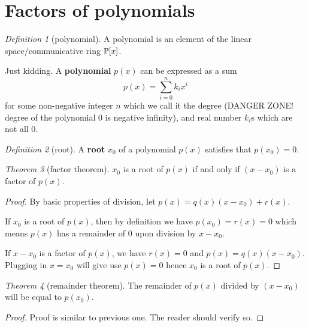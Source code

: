\documentclass[8pt]{article}
\theoremstyle{remark}
\newtheorem{theorem}{Theorem}[section]
\newtheorem{definition}[theorem]{Definition}
\begin{document}
    \section{Factors of polynomials}
        \begin{definition}[polynomial]
            A polynomial is an element of the linear space/communicative ring $\mathbb{P} [x]$.

            Just kidding. A \textbf{polynomial} $p(x)$ can be expressed as a sum
            $$
                p(x) = \sum_{i = 0}^{n} k_i x^i
            $$
            for some non-negative integer $n$ which we call it the degree (DANGER ZONE! degree of the polynomial 0 is negative infinity), and real number $k_i$s which are not all 0. 
        \end{definition}

        \begin{definition}[root]
            A \textbf{root} $x_0$ of a polynomial $p(x)$ satisfies that $p(x_0) = 0$.
        \end{definition}

        \begin{theorem}[factor theorem]
            $x_0$ is a root of $p(x)$ if and only if $(x - x_0)$ is a factor of $p(x)$.

            \begin{proof}
                By basic properties of division, let $p(x) = q(x) (x - x_0) + r(x)$.

                If $x_0$ is a root of $p(x)$, then by definition we have $p(x_0) = r(x) = 0$ which means $p(x)$ has a remainder of $0$ upon division by $x - x_0$.
                
                If $x - x_0$ is a factor of $p(x)$, we have $r(x) = 0$ and $p(x) = q(x) (x - x_0)$. Plugging in $x = x_0$ will give use $p(x) = 0$ hence $x_0$ is a root of $p(x)$.
            \end{proof}
        \end{theorem}

        \begin{theorem}[remainder theorem]
            The remainder of $p(x)$ divided by $(x - x_0)$ will be equal to $p(x_0)$.

            \begin{proof}
                Proof is similar to previous one. The reader should verify so.
            \end{proof}
        \end{theorem}
\end{document}
